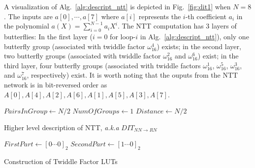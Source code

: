 \documentclass{iacrtrans}
\theoremstyle{plain}
\begin{document}
A visualization of Alg.~\ref{alg:descript_ntt} is depicted in Fig.~\ref{fig:dit1} when $N=8$. The inputs are $a[0],\cdots,a[7]$ where $a[i]$ represents the $i$-th coefficient $a_i$ in the polynomial $a(X)=\sum_{i=0}^{N-1}a_iX^i$. The NTT computation has 3 layers of butterflies: In the first layer ($i=0$ for loop-$i$ in Alg.~\ref{alg:descript_ntt}), only one butterfly group (associated with twiddle factor $\omega_{16}^4$) exists; in the second layer, two butterfly groups (associated with twiddle factor $\omega_{16}^2$ and $\omega_{16}^6$) exist; in the third layer, four butterfly groups (associated with twiddle factors $\omega_{16}^1$, $\omega_{16}^5$, $\omega_{16}^3$, and $\omega_{16}^7$, respectively) exist. It is worth noting that the ouputs from the NTT network is in bit-reversed order as $A[0],A[4],A[2],A[6],A[1],A[5],A[3],A[7]$.

\begin{algorithm}[!tbh]
 \DontPrintSemicolon %
    $PairsInGroup \gets N/2$\;
    $NumOfGroups \gets 1$\;
    $Distance \gets N/2$\;
 \caption{Higher level description of NTT, \textit{a.k.a} $DIT_{NN\to RN}$}\label{alg:descript_ntt}
\end{algorithm}

\begin{algorithm}[!tbh]
 \DontPrintSemicolon %
    $FirstPart \gets [0\cdots0]_2$\;{}
    $SecondPart \gets [1\cdots0]_2$\;
 \caption{Construction of Twiddle Factor LUTs}\label{alg:descript_twiddlefactor}
\end{algorithm}
\end{document}
